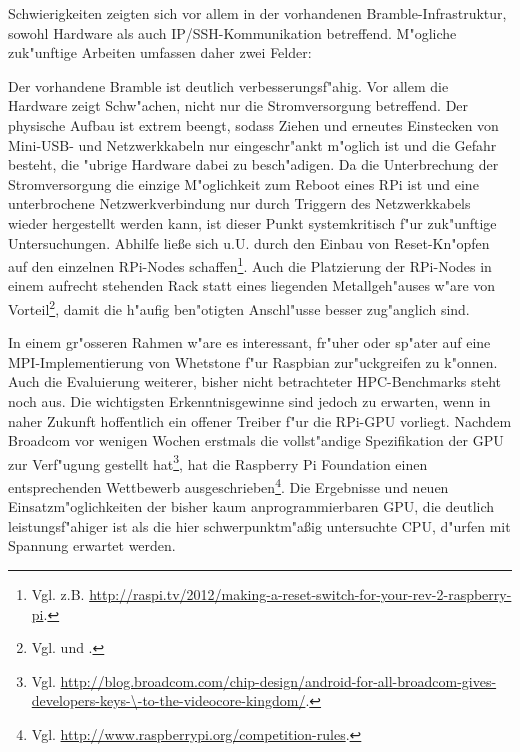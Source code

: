 Schwierigkeiten zeigten sich vor allem in der vorhandenen Bramble-Infrastruktur, sowohl Hardware als auch IP/SSH-Kommunikation betreffend. M"ogliche zuk"unftige Arbeiten umfassen daher zwei Felder: 

Der vorhandene Bramble ist deutlich verbesserungsf"ahig. Vor allem die Hardware zeigt Schw"achen, nicht nur die Stromversorgung betreffend. Der physische Aufbau ist extrem beengt, sodass Ziehen und erneutes Einstecken von Mini-USB- und Netzwerkkabeln nur eingeschr"ankt m"oglich ist und die Gefahr besteht, die "ubrige Hardware dabei zu besch"adigen. Da die Unterbrechung der Stromversorgung die einzige M"oglichkeit zum Reboot eines RPi ist und eine unterbrochene Netzwerkverbindung nur durch Triggern des Netzwerkkabels wieder hergestellt werden kann, ist dieser Punkt systemkritisch f"ur zuk"unftige Untersuchungen. Abhilfe lie\ss e sich u.U. durch den Einbau von Reset-Kn"opfen auf den einzelnen RPi-Nodes schaffen\footnote{Vgl. z.B. \url{http://raspi.tv/2012/making-a-reset-switch-for-your-rev-2-raspberry-pi}.}. Auch die Platzierung der RPi-Nodes in einem aufrecht stehenden Rack statt eines liegenden Metallgeh"auses w"are von Vorteil\footnote{Vgl. \cite{kie01} und \cite{cox13}.}, damit die h"aufig ben"otigten Anschl"usse besser zug"anglich sind. 

In einem gr"osseren Rahmen w"are es interessant, fr"uher oder sp"ater auf eine MPI-Implemen\-tierung von Whetstone f"ur Raspbian zur"uckgreifen zu k"onnen. Auch die Evaluierung weiterer, bisher nicht betrachteter HPC-Benchmarks steht noch aus. Die wichtigsten Erkenntnisgewinne sind jedoch zu erwarten, wenn in naher Zukunft hoffentlich ein offener Treiber f"ur die RPi-GPU vorliegt. Nachdem Broadcom vor wenigen Wochen erstmals die vollst"andige Spezifikation der GPU zur Verf"ugung gestellt hat\footnote{Vgl. \url{http://blog.broadcom.com/chip-design/android-for-all-broadcom-gives-developers-keys-\-to-the-videocore-kingdom/}.}, hat die Raspberry Pi Foundation einen entsprechenden Wettbewerb ausgeschrieben\footnote{Vgl. \url{http://www.raspberrypi.org/competition-rules}.}. Die Ergebnisse und neuen Einsatzm"oglichkeiten der bisher kaum anprogrammierbaren GPU, die deutlich leistungsf"ahiger ist als die hier schwerpunktm"a\ss ig untersuchte CPU, d"urfen mit Spannung erwartet werden. 
\endinput